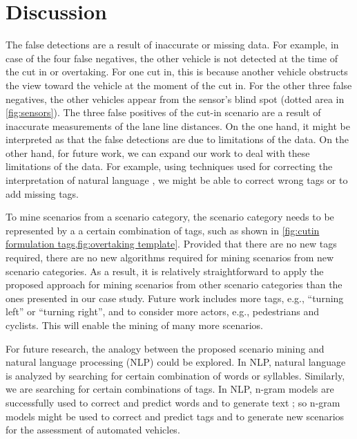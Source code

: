 \cstartf\section{Discussion}\cendf
\label{sec:discussion}

\cstartd The false detections are a result of inaccurate or missing data.
For example, in case of the four false negatives, the other vehicle is not detected at the time of the cut in or overtaking.
For one cut in, this is because another vehicle obstructs the view toward the vehicle at the moment of the cut in. 
For the other three false negatives, the other vehicles appear from the sensor's blind spot (dotted area in \cref{fig:sensors}).
The three false positives of the cut-in scenario are a result of inaccurate measurements of the lane line distances. \cendd
\cstartf On the one hand, it might be interpreted as that the false detections are due to limitations of the data.
On the other hand, for future work, we can expand our work to deal with these limitations of the data.
For example, using techniques used for correcting the interpretation of natural language \autocite{hull1982experiments}, we might be able to correct wrong tags or to add missing tags. \cendf

\cstartf To mine scenarios from a scenario category, the scenario category needs to be represented by a a certain combination of tags, such as shown in \cref{fig:cutin formulation tags,fig:overtaking template}.
Provided that there are no new tags required, there are no new algorithms required for mining scenarios from new scenario categories. 
As a result, it is relatively straightforward to apply the proposed approach for mining scenarios from other scenario categories than the ones presented in our case study. \cendf
\cstarte Future work includes more tags, e.g., ``turning left'' or ``turning right'', and to consider more actors, e.g., pedestrians and cyclists. This will enable the mining of many more scenarios. \cende

\cstartf For future research, the analogy between the proposed scenario mining and natural language processing (NLP) could be explored. 
In NLP, natural language is analyzed by searching for certain combination of words or syllables. 
Similarly, we are searching for certain combinations of tags. \cendf
\cstarte In NLP, n-gram models are successfully used to correct \autocite{hull1982experiments} and predict \autocite{brown1992class} words and to generate text \autocite{oh2002stochastic}; so n-gram models might be used to correct and predict tags and to generate new scenarios for the assessment of automated vehicles. \cende
